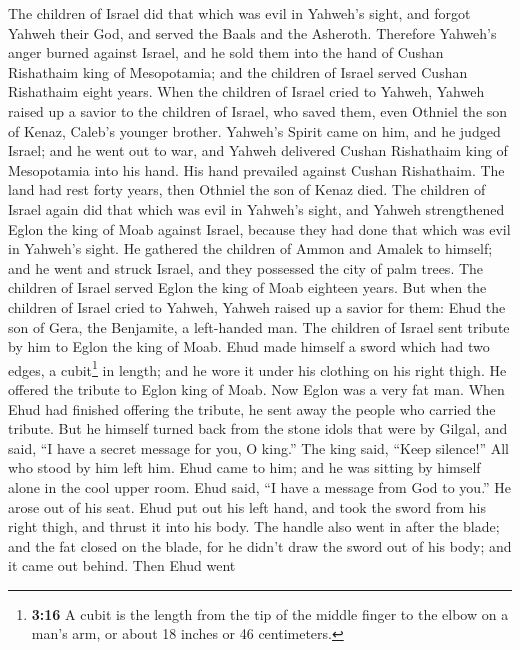  The children of Israel did that which was evil in
Yahweh's sight, and forgot Yahweh their God, and served the Baals and
the Asheroth.  Therefore Yahweh's anger burned against
Israel, and he sold them into the hand of Cushan Rishathaim king of
Mesopotamia; and the children of Israel served Cushan Rishathaim eight
years.  When the children of Israel cried to Yahweh,
Yahweh raised up a savior to the children of Israel, who saved them,
even Othniel the son of Kenaz, Caleb's younger brother. 
Yahweh's Spirit came on him, and he judged Israel; and he went out to
war, and Yahweh delivered Cushan Rishathaim king of Mesopotamia into his
hand. His hand prevailed against Cushan Rishathaim.  The
land had rest forty years, then Othniel the son of Kenaz died.
 The children of Israel again did that which was evil in
Yahweh's sight, and Yahweh strengthened Eglon the king of Moab against
Israel, because they had done that which was evil in Yahweh's sight.
 He gathered the children of Ammon and Amalek to himself;
and he went and struck Israel, and they possessed the city of palm
trees.  The children of Israel served Eglon the king of
Moab eighteen years.  But when the children of Israel
cried to Yahweh, Yahweh raised up a savior for them: Ehud the son of
Gera, the Benjamite, a left-handed man. The children of Israel sent
tribute by him to Eglon the king of Moab.  Ehud made
himself a sword which had two edges, a cubit\footnote{\textbf{3:16} A
  cubit is the length from the tip of the middle finger to the elbow on
  a man's arm, or about 18 inches or 46 centimeters.} in length; and he
wore it under his clothing on his right thigh.  He
offered the tribute to Eglon king of Moab. Now Eglon was a very fat man.
 When Ehud had finished offering the tribute, he sent
away the people who carried the tribute.  But he himself
turned back from the stone idols that were by Gilgal, and said, ``I have
a secret message for you, O king.'' The king said, ``Keep silence!'' All
who stood by him left him.  Ehud came to him; and he was
sitting by himself alone in the cool upper room. Ehud said, ``I have a
message from God to you.'' He arose out of his seat. 
Ehud put out his left hand, and took the sword from his right thigh, and
thrust it into his body.  The handle also went in after
the blade; and the fat closed on the blade, for he didn't draw the sword
out of his body; and it came out behind.  Then Ehud went
